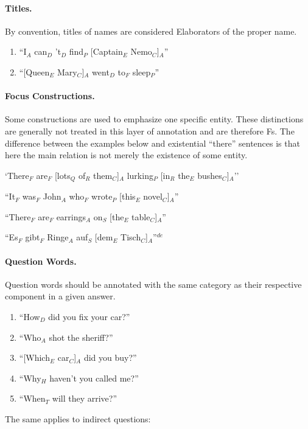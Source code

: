 \documentclass[11pt]{article}
\newcommand{\be}{\begin{enumerate}}
\newcommand{\ee}{\end{enumerate}}
\newcommand{\german}[1]{{\color{red}#1$^{de}$}}
\newcommand{\dd}[1]{{\color{blue}{#1}}}
\begin{document}
\paragraph{Titles.} By convention, titles of names are considered Elaborators of the proper name.

\be 
\item
``I$_A$ can$_D$ 't$_D$ find$_P$ [Captain$_E$ Nemo$_C$]$_A$''
\item
``[Queen$_E$ Mary$_C$]$_A$ went$_D$ to$_F$ sleep$_P$''
\ee

\paragraph{Focus Constructions.} Some constructions are used to emphasize one specific entity. These distinctions are generally not treated in this layer of annotation and are therefore Fs.
The difference between the examples below and existential ``there'' sentences is that here the main relation is not merely
the existence of some entity.
\be
\item
 `There$_F$ are$_F$ [lots$_Q$ of$_R$ them$_C$]$_A$ lurking$_P$ [in$_R$ the$_E$ bushes$_C$]$_A$''
\item
``It$_F$ was$_F$  John$_A$ who$_F$ wrote$_P$ [this$_E$ novel$_C$]$_A$''

\item
``There$_F$ are$_F$ earrings$_A$ on$_S$ [the$_E$ table$_C$]$_A$''
\german{
\item
``Es$_F$ gibt$_F$ Ringe$_A$ auf$_S$ [dem$_E$ Tisch$_C$]$_A$''}
\ee

\paragraph{Question Words.} Question words should be annotated with the same category as their respective component in a given answer. 

\be \item
``How$_D$ did you fix your car?''
\item
``Who$_A$ shot the sheriff?''
\item
``[Which$_E$ car$_C$]$_A$ did you buy?''
\item
``Why$_H$ haven't you called me?''
\item
``When$_T$ will they arrive?''
\ee

The same applies to indirect questions:
\end{document}
